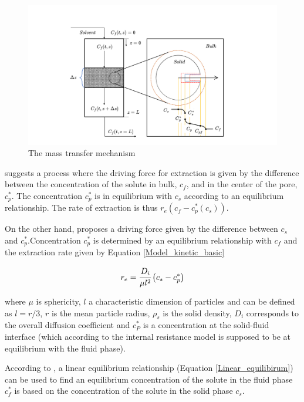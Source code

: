 \documentclass[../Article_Model_Parameters.tex]{subfiles}
\begin{document}
		\begin{figure}[h!]
			\centering
			\includegraphics[trim = 45cm 0cm 60cm 20cm,clip,width=0.85\columnwidth]{Figures/SFE_PFD.drawio.png}	
			\caption{The mass transfer mechanism}
			\label{fig: SFE_Mechanism}
		\end{figure}
			
		\citet{Bulley1984} suggests a process where the driving force for extraction is given by the difference between the concentration of the solute in bulk, $c_f$, and in the center of the pore, $c_p^*$. The concentration $c_p^*$ is in equilibrium with $c_s$ according to an equilibrium relationship. The rate of extraction is thus $r_e\left(c_f - c^*_p(c_s)\right)$.  
			
		On the other hand, \citet{Reverchon1996} proposes a driving force given by the difference between $c_s$ and $c_p^*$.Concentration $c_p^*$ is determined by an equilibrium relationship with $c_f$ and the extraction rate given by Equation \ref{Model_kinetic_basic}
			
			{\footnotesize
				\begin{equation} \label{Model_kinetic_basic}
					r_e = \cfrac{D_i}{\mu l^2 }\left(c_s - c_p^* \right)
			\end{equation} }
			
		where $\mu$ is sphericity, $l$ a characteristic dimension of particles and can be defined as $l = r/3$, $r$ is the mean particle radius, $\rho_s$ is the solid density, $D_i$ corresponds to the overall diffusion coefficient and $c_P^*$ is a concentration at the solid-fluid interface (which according to the internal resistance model is supposed to be at equilibrium with the fluid phase). 
			
		According to \citet{Bulley1984}, a linear equilibrium relationship (Equation  \ref{Linear_equilibirum}) can be used to find an equilibrium concentration of the solute in the fluid phase $c_f^*$ is based on the concentration of the solute in the solid phase $c_s$.
			
\end{document}
